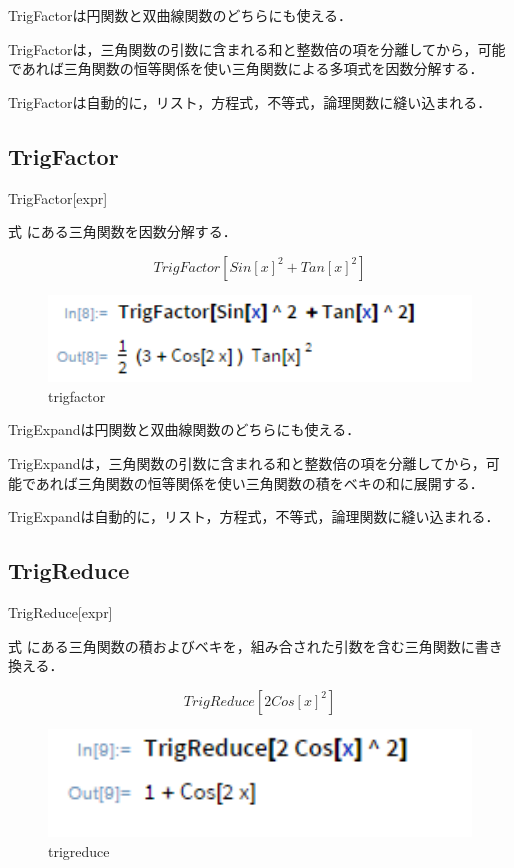 TrigFactorは円関数と双曲線関数のどちらにも使える．

TrigFactorは，三角関数の引数に含まれる和と整数倍の項を分離してから，可能であれば三角関数の恒等関係を使い三角関数による多項式を因数分解する．

TrigFactorは自動的に，リスト，方程式，不等式，論理関数に縫い込まれる．

\subsection {TrigFactor}

TrigFactor[expr]

式 にある三角関数を因数分解する．

\[TrigFactor[Sin[x]^2 + Tan[x]^2]\]

\begin{figure}[h]
\centering
\includegraphics[width=15cm]{trigfactor.png}
\caption{trigfactor}\label{図}
\end{figure}

TrigExpandは円関数と双曲線関数のどちらにも使える．

TrigExpandは，三角関数の引数に含まれる和と整数倍の項を分離してから，可能であれば三角関数の恒等関係を使い三角関数の積をベキの和に展開する．

TrigExpandは自動的に，リスト，方程式，不等式，論理関数に縫い込まれる．

\clearpage

\subsection {TrigReduce}

TrigReduce[expr]

式 にある三角関数の積およびベキを，組み合された引数を含む三角関数に書き換える．

\[TrigReduce[2 Cos[x]^2]\]

\begin{figure}[h]
\centering
\includegraphics[width=15cm]{trigreduce.png}
\caption{trigreduce}\label{図}
\end{figure}

